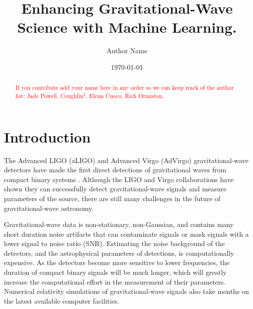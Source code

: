 \documentclass[letterpaper, aps, prd, superscriptaddress, showpacs, nofootinbib]{revtex4}
\newcommand{\todo}{\textcolor{red}}
\begin{document}
\title{Enhancing Gravitational-Wave Science with Machine Learning.}

\newcommand*{\ozgrav}{Universiry}
\affiliation{\ozgrav}

\author{Author Name}  \affiliation{\ozgrav}	

\date{\today}

\begin{abstract} 
\todo{If you contribute add your name here in any order so we can keep track of
the author list: Jade Powell, Coughlin$^2$, Elena Cuoco, Rich Ormiston.}

\end{abstract}

\maketitle

\section{Introduction}
\label{sec:intro}

The Advanced LIGO (aLIGO) \cite{aLIGO} and Advanced Virgo (AdVirgo) \cite{AdVirgo} gravitational-wave detectors have made the first direct detections of gravitational waves from compact binary systems \cite{2016PhRvX...6d1015A}. Although the LIGO and Virgo collaborations have shown they can successfully detect gravitational-wave signals and measure parameters of the source, there are still many challenges in the future of gravitational-wave astronomy. 

Gravitational-wave data is non-stationary, non-Gaussian, and contains many short duration noise artifacts that can contaminate signals or mask signals with a lower signal to noise ratio (SNR). Estimating the noise background of the detectors, and the astrophysical parameters of detections, is computationally expensive. As the detectors become more sensitive to lower frequencies, the duration of compact binary signals will be much longer, which will greatly increase the computational effort in the measurement of their parameters. Numerical relativity simulations of gravitational-wave signals also take months on the latest available computer facilities.  
 
\end{document}
